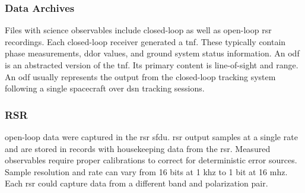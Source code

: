 \documentclass{article}
\begin{document}
            \subsubsection{Data Archives}
                Files with science observables include
                \gls{closed-loop} 
                as well as \gls{open-loop} \gls{rsr} recordings.
                Each \gls{closed-loop} receiver generated a
                \gls{tnf}. These typically contain
                 \gls{phase}
                measurements, \gls{ddor} values, and ground system
                status information. An \gls{odf} is an abstracted
                version of the \gls{tnf}. Its primary content is
                line-of-sight 
                and range. An \gls{odf} usually represents the
                output from the \gls{closed-loop} tracking system
                following a single spacecraft over
                \gls{dsn} tracking sessions. 
            \subsubsection{\footnotesize{RSR}}
                \label{subsubsec:usr_RSR}
                \Gls{open-loop} data were captured in the
                \gls{rsr} \gls{sfdu}. \gls{rsr} output samples
                at a single rate and are stored in records with
                housekeeping data from the \gls{rsr}. Measured
                observables require proper calibrations to
                correct for deterministic error sources. Sample
                resolution and rate can vary from 16 \glspl{bit}
                at 1 \gls{khz} to 1 \gls{bit} at 16 \gls{mhz}.
                Each \gls{rsr} could capture data from a
                different band and \gls{polarization} pair.
\end{document}

